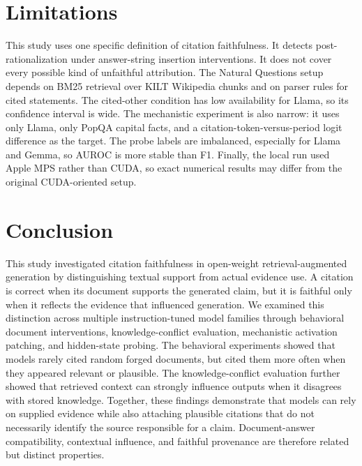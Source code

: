 \documentclass[11pt]{article}
\begin{document}
\section{Limitations}
\label{sec:limitations}

This study uses one specific definition of citation faithfulness. It detects post-rationalization under answer-string insertion interventions. It does not cover every possible kind of unfaithful attribution. The Natural Questions setup depends on BM25 retrieval over KILT Wikipedia chunks and on parser rules for cited statements. The cited-other condition has low availability for Llama, so its confidence interval is wide. The mechanistic experiment is also narrow: it uses only Llama, only PopQA capital facts, and a citation-token-versus-period logit difference as the target. The probe labels are imbalanced, especially for Llama and Gemma, so AUROC is more stable than F1. Finally, the local run used Apple MPS rather than CUDA, so exact numerical results may differ from the original CUDA-oriented setup.

\section{Conclusion}
\label{sec:conclusion}

This study investigated citation faithfulness in open-weight retrieval-augmented generation by distinguishing textual support from actual evidence use. A citation is correct when its document supports the generated claim, but it is faithful only when it reflects the evidence that influenced generation. We examined this distinction across multiple instruction-tuned model families through behavioral document interventions, knowledge-conflict evaluation, mechanistic activation patching, and hidden-state probing. The behavioral experiments showed that models rarely cited random forged documents, but cited them more often when they appeared relevant or plausible. The knowledge-conflict evaluation further showed that retrieved context can strongly influence outputs when it disagrees with stored knowledge. Together, these findings demonstrate that models can rely on supplied evidence while also attaching plausible citations that do not necessarily identify the source responsible for a claim. Document-answer compatibility, contextual influence, and faithful provenance are therefore related but distinct properties.
\end{document}
